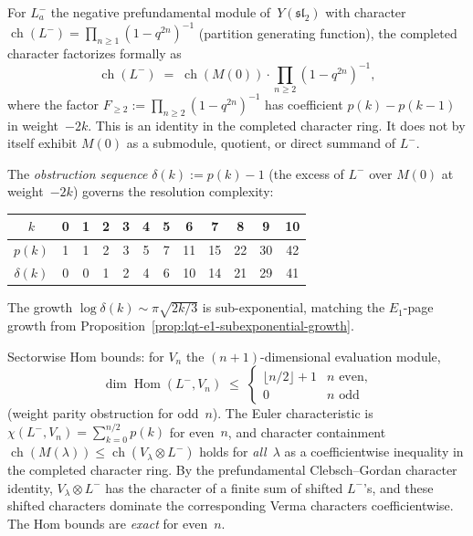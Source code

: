 \begin{computation}
\label{comp:thick-generation-sl2}
For $L^-_a$ the negative prefundamental module of~$Y(\mathfrak{sl}_2)$
with character $\operatorname{ch}(L^-) = \prod_{n \geq 1}(1-q^{2n})^{-1}$
(partition generating function), the completed character factorizes
formally as
\begin{equation}\label{eq:fock-verma-factorization}
 \operatorname{ch}(L^-)
 \;=\;
 \operatorname{ch}(M(0)) \cdot \prod_{n \geq 2}(1-q^{2n})^{-1},
\end{equation}
where the factor \(F_{\ge2}:=\prod_{n\ge2}(1-q^{2n})^{-1}\) has
coefficient \(p(k)-p(k-1)\) in weight~\(-2k\). This is an identity in
the completed character ring. It does not by itself exhibit \(M(0)\)
as a submodule, quotient, or direct summand of \(L^-\).

The \emph{obstruction sequence} $\delta(k) := p(k) - 1$ (the excess
of $L^-$ over $M(0)$ at weight~$-2k$) governs the resolution
complexity:
\begin{center}
\renewcommand{\arraystretch}{1.1}
\begin{tabular}{c|ccccccccccc}
$k$ & 0 & 1 & 2 & 3 & 4 & 5 & 6 & 7 & 8 & 9 & 10 \\
\hline
$p(k)$ & 1 & 1 & 2 & 3 & 5 & 7 & 11 & 15 & 22 & 30 & 42 \\
$\delta(k)$ & 0 & 0 & 1 & 2 & 4 & 6 & 10 & 14 & 21 & 29 & 41
\end{tabular}
\end{center}
The growth $\log\delta(k) \sim \pi\sqrt{2k/3}$ is
sub-exponential, matching the $E_1$-page growth from
Proposition~\ref{prop:lqt-e1-subexponential-growth}.

Sectorwise Hom bounds: for $V_n$ the $(n{+}1)$-dimensional
evaluation module,
\[
 \dim\operatorname{Hom}(L^-, V_n)
 \;\leq\;
 \begin{cases}
 \lfloor n/2\rfloor + 1 & \text{$n$ even,} \\
 0 & \text{$n$ odd}
 \end{cases}
\]
(weight parity obstruction for odd~$n$). The Euler characteristic
is $\chi(L^-, V_n) = \sum_{k=0}^{n/2} p(k)$ for even~$n$,
and character containment
$\operatorname{ch}(M(\lambda)) \leq
	 \operatorname{ch}(V_\lambda \otimes L^-)$
holds for \emph{all}~$\lambda$ as a coefficientwise inequality in the
completed character ring. By the prefundamental Clebsch--Gordan
character identity, \(V_\lambda\otimes L^-\) has the character of a
finite sum of shifted \(L^-\)'s, and these shifted characters dominate
the corresponding Verma characters coefficientwise.
The Hom bounds are \emph{exact} for even~$n$.


\end{computation}
